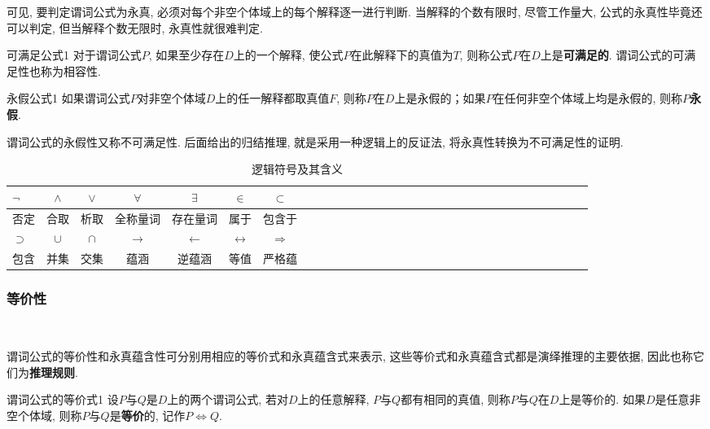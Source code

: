 可见, 要判定谓词公式为永真, 必须对每个非空个体域上的每个解释逐一进行判断. 当解释的个数有限时, 尽管工作量大, 公式的永真性毕竟还可以判定, 但当解释个数无限时, 永真性就很难判定.
\begin{mydef}{可满足公式}{1}
对于谓词公式$P$, 如果至少存在$D$上的一个解释, 使公式$P$在此解释下的真值为$T$, 则称公式$P$在$D$上是\textbf{可满足的}.
谓词公式的可满足性也称为相容性.
\end{mydef}
\begin{mydef}{永假公式}{1}
如果谓词公式$P$对非空个体域$D$上的任一解释都取真值$F$, 则称$P$在$D$上是永假的；如果$P$在任何非空个体域上均是永假的, 则称\textbf{$P$永假}.
\end{mydef}
\begin{remark}
  谓词公式的永假性又称不可满足性. 后面给出的归结推理, 就是采用一种逻辑上的反证法, 将永真性转换为不可满足性的证明.
\end{remark}
\begin{table}[H]
\caption{逻辑符号及其含义}
\vspace{-0.3cm}
\begin{center}
\begin{tabular} {lccccccccccccccccccccccccccccccc}
\hline
$\neg$&$\wedge$&$\vee$&$\forall$&$\exists$&$\in$&$\subset$\\
\hline
否定	&合取&析取&全称量词&存在量词&属于&包含于\\
\hline
$\supset$&$\cup$&$\cap$&$\rightarrow$&$\leftarrow$&$\leftrightarrow$&$\Rightarrow$\\
\hline
包含&并集&交集&蕴涵&逆蕴涵&等值&严格蕴\\
\hline
\end{tabular}
\end{center}
\label{AItable202020020101}
\end{table}
\subsubsection{等价性}~{}

谓词公式的等价性和永真蕴含性可分别用相应的等价式和永真蕴含式来表示, 这些等价式和永真蕴含式都是演绎推理的主要依据, 因此也称它们为\textbf{推理规则}.

\begin{mydef}{谓词公式的等价式}{1}
设$P$与$Q$是$D$上的两个谓词公式, 若对$D$上的任意解释, $P$与$Q$都有相同的真值, 则称$P$与$Q$在$D$上是等价的. 如果$D$是任意非空个体域, 则称$P$与$Q$是\textbf{等价}的, 记作$P\Leftrightarrow Q$.
\end{mydef}

